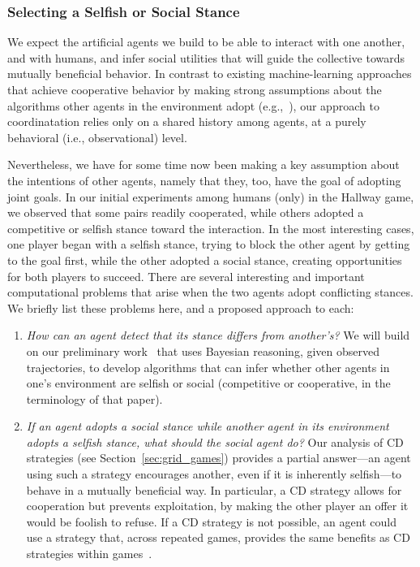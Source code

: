 
\subsubsection*{\large Selecting a Selfish or Social Stance}
\label{sec:stance}

We expect the artificial agents we build to be able to interact with
one another, and with humans, and infer social utilities that will
guide the collective towards mutually beneficial behavior.  In
contrast to existing machine-learning approaches that achieve
cooperative behavior by making strong assumptions about the algorithms
other agents in the environment adopt (e.g.,~\cite{conitzer07}), our
approach to coordinatation relies only on a shared history among
agents, at a purely behavioral (i.e., observational) level.

Nevertheless, we have for some time now been making a key assumption
about the intentions of other agents, namely that they, too, have the
goal of adopting joint goals.  In our initial experiments among humans
(only) in the Hallway game, we observed that some pairs readily
cooperated, while others adopted a competitive or selfish stance
toward the interaction.  In the most interesting cases, one player
began with a selfish stance, trying to block the other agent by
getting to the goal first, while the other adopted a social stance,
creating opportunities for both players to succeed.  There are several
interesting and important computational problems that arise when the
two agents adopt conflicting stances.  We briefly list these problems
here, and a proposed approach to each:

\begin{enumerate}

\item \emph{How can an agent detect that its stance differs from another's?}
  We will build on our preliminary work~\cite{kleiman16} that uses
  Bayesian reasoning, given observed trajectories, to develop
  algorithms that can infer whether other agents in one's environment
  are selfish or social (competitive or cooperative, in the
  terminology of that paper).
  
\item \emph{If an agent adopts a social stance while another agent in 
  its environment adopts a selfish stance, what should the social
  agent do?}  Our analysis of CD strategies (see
  Section~\ref{sec:grid_games}) provides a partial answer---an agent
  using such a strategy encourages another, even if it is inherently
  selfish---to behave in a mutually beneficial way.  In particular, a
  CD strategy allows for cooperation but prevents exploitation, by
  making the other player an offer it would be foolish to refuse.  If
  a CD strategy is not possible, an agent could
  use a strategy that, across repeated games, provides the same
  benefits as CD strategies within games~\cite{munoz08}.
  
\end{enumerate}


